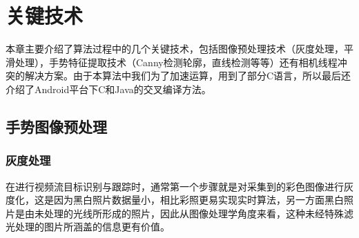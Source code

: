 \documentclass{XDBAthesis}
\begin{document}
\else
{}

\lstset{numbers=left,
extendedchars=false,
escapechar=@,style=customc
}
\fi

\chapter{关键技术}
本章主要介绍了算法过程中的几个关键技术，包括图像预处理技术（灰度处理，平滑处理），手势特征提取技术（Canny检测轮廓，直线检测等等）还有相机线程冲突的解决方案。由于本算法中我们为了加速运算，用到了部分C语言，所以最后还介绍了Android平台下C和Java的交叉编译方法。

%

\section{手势图像预处理}

\subsection{灰度处理}

在进行视频流目标识别与跟踪时，通常第一个步骤就是对采集到的彩色图像进行灰度化\cite{黄柏林2002基于边界特征的人脸识别}，这是因为黑白照片数据量小，相比彩照更易实现实时算法，另一方面黑白照片是由未处理的光线所形成的照片，因此从图像处理学角度来看，这种未经特殊滤光处理的图片所涵盖的信息更有价值。
\end{document}
